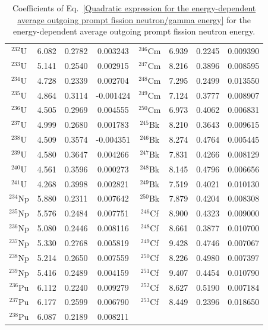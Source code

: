 \begin{table}[ht]
\begin{center}
\begin{tabular}{|c|c|c|c||c|c|c|c|}
$^{232}$U & 6.082 & 0.2782 & 0.003243 & $^{246}$Cm & 6.939 & 0.2245 & 0.009390 \\ 
$^{233}$U & 5.141 & 0.2540 & 0.002915 & $^{247}$Cm & 8.216 & 0.3896 & 0.008595 \\ 
$^{234}$U & 4.728 & 0.2339 & 0.002704 & $^{248}$Cm & 7.295 & 0.2499 & 0.013550 \\ 
$^{235}$U & 4.864 & 0.3114 & -0.001424 & $^{249}$Cm & 7.124 & 0.3777 & 0.008907 \\ 
$^{236}$U & 4.505 & 0.2969 & 0.004555 & $^{250}$Cm & 6.973 & 0.4062 & 0.006831 \\ 
$^{237}$U & 4.999 & 0.2680 & 0.001783 & $^{245}$Bk & 8.210 & 0.3643 & 0.009615 \\ 
$^{238}$U & 4.509 & 0.3574 & -0.004351 & $^{246}$Bk & 8.274 & 0.4764 & 0.005445 \\ 
$^{239}$U & 4.580 & 0.3647 & 0.004266 & $^{247}$Bk & 7.831 & 0.4266 & 0.008129 \\ 
$^{240}$U & 4.561 & 0.3596 & 0.000273 & $^{248}$Bk & 8.145 & 0.4796 & 0.006656 \\ 
$^{241}$U & 4.268 & 0.3998 & 0.002821 & $^{249}$Bk & 7.519 & 0.4021 & 0.010130 \\ 
$^{234}$Np & 5.880 & 0.2311 & 0.007642 & $^{250}$Bk & 7.879 & 0.4204 & 0.008308 \\ 
$^{235}$Np & 5.576 & 0.2484 & 0.007751 & $^{246}$Cf & 8.900 & 0.4323 & 0.009000 \\ 
$^{236}$Np & 5.080 & 0.2446 & 0.008116 & $^{248}$Cf & 8.661 & 0.3877 & 0.010700 \\ 
$^{237}$Np & 5.330 & 0.2768 & 0.005819 & $^{249}$Cf & 9.428 & 0.4746 & 0.007067 \\ 
$^{238}$Np & 5.214 & 0.2650 & 0.007559 & $^{250}$Cf & 8.226 & 0.4980 & 0.007397 \\ 
$^{239}$Np & 5.416 & 0.2489 & 0.004159 & $^{251}$Cf & 9.407 & 0.4454 & 0.010790 \\ 
$^{236}$Pu & 6.112 & 0.2240 & 0.009279 & $^{252}$Cf & 8.627 & 0.5190 & 0.007184 \\ 
$^{237}$Pu & 6.177 & 0.2599 & 0.006790 & $^{253}$Cf & 8.449 & 0.2396 & 0.018650 \\ 
$^{238}$Pu & 6.087 & 0.2189 & 0.008211 & & & & \\ \hline 
\end{tabular}
\end{center}
\caption{Coefficients of Eq.~\ref{Quadratic expression for the 
energy-dependent average outgoing prompt fission neutron/gamma 
energy} for the energy-dependent average outgoing prompt fission 
neutron energy.}
\label{Coefficients for prompt fission neutrons}
\end{table}

